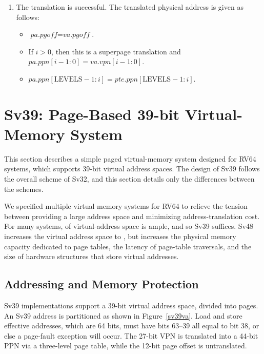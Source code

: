 \begin{enumerate}
\item The translation is successful. The translated physical address is
  given as follows:
\begin{itemize}
\item $\textit{pa.pgoff} = \textit{va.pgoff}$.
\item If $i>0$, then this is a superpage translation and $pa.ppn[i-1:0]=va.vpn[i-1:0]$.
\item $pa.ppn[\textrm{LEVELS} - 1:i] = pte.ppn[\textrm{LEVELS} - 1:i]$.
\end{itemize}

\end{enumerate}

\section{Sv39: Page-Based 39-bit Virtual-Memory System}
\label{sec:sv39}

This section describes a simple paged virtual-memory system designed
for RV64 systems, which supports 39-bit virtual address spaces.  The
design of Sv39 follows the overall scheme of Sv32, and this section
details only the differences between the schemes.

\begin{commentary}
We specified multiple virtual memory systems for RV64 to relieve the tension
between providing a large address space and minimizing address-translation
cost.  For many systems,  of virtual-address space is ample,
and so Sv39 suffices.  Sv48 increases the virtual address space to
, but increases the physical memory
capacity dedicated to page tables, the latency of page-table traversals, and
the size of hardware structures that store virtual addresses.
\end{commentary}

\subsection{Addressing and Memory Protection}

Sv39 implementations support a 39-bit virtual address space, divided
into  pages.  An Sv39 address is partitioned as
shown in Figure~\ref{sv39va}.  Load and store effective addresses,
which are 64 bits, must have bits 63--39 all equal to bit 38, or else
a page-fault exception will occur.  The 27-bit VPN is translated into a
44-bit PPN via a three-level page table, while the 12-bit page offset
is untranslated.

